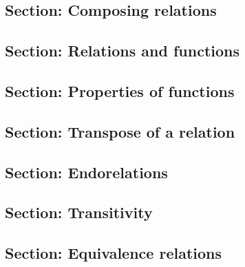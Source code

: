 \subsection{Section: Composing relations}  


\subsection{Section: Relations and functions}  

\subsection{Section: Properties of functions}  

\subsection{Section: Transpose of a relation}  

\subsection{Section: Endorelations}

\subsection{Section: Transitivity} 

\subsection{Section: Equivalence relations}       
 

